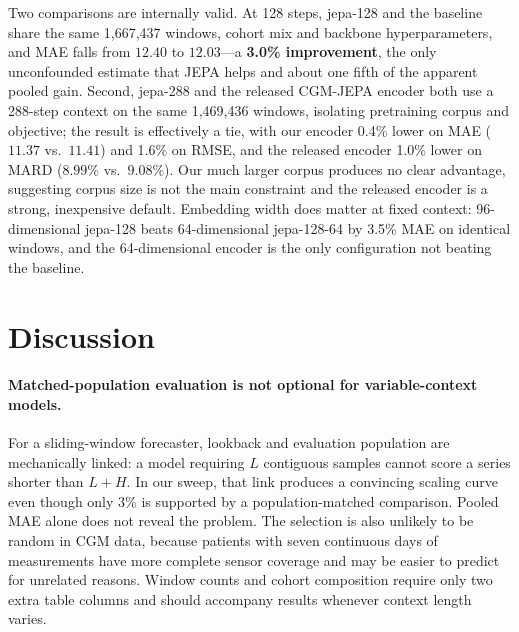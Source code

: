 \documentclass[11pt,a4paper]{article}
\begin{document}
Two comparisons are internally valid.
At 128 steps, jepa-128 and the baseline share the same 1,667,437 windows, cohort mix and backbone hyperparameters, and MAE falls from $12.40$ to $12.03$---a \textbf{3.0\% improvement}, the only unconfounded estimate that JEPA helps and about one fifth of the apparent pooled gain.
Second, jepa-288 and the released CGM-JEPA encoder both use a 288-step context on the same 1,469,436 windows, isolating pretraining corpus and objective; the result is effectively a tie, with our encoder 0.4\% lower on MAE ($11.37$ vs.\ $11.41$) and 1.6\% on RMSE, and the released encoder 1.0\% lower on MARD ($8.99\%$ vs.\ $9.08\%$).
Our much larger corpus produces no clear advantage, suggesting corpus size is not the main constraint and the released encoder is a strong, inexpensive default.
Embedding width does matter at fixed context: 96-dimensional jepa-128 beats 64-dimensional jepa-128-64 by 3.5\% MAE on identical windows, and the 64-dimensional encoder is the only configuration not beating the baseline.

\section{Discussion}

\paragraph{Matched-population evaluation is not optional for variable-context models.}
For a sliding-window forecaster, lookback and evaluation population are mechanically linked: a model requiring $L$ contiguous samples cannot score a series shorter than $L + H$.
In our sweep, that link produces a convincing scaling curve even though only 3\% is supported by a population-matched comparison.
Pooled MAE alone does not reveal the problem.
The selection is also unlikely to be random in CGM data, because patients with seven continuous days of measurements have more complete sensor coverage and may be easier to predict for unrelated reasons.
Window counts and cohort composition require only two extra table columns and should accompany results whenever context length varies.
\end{document}
